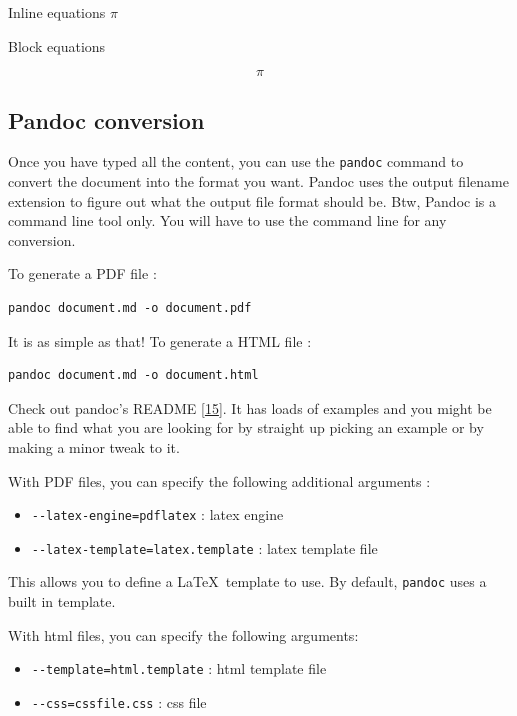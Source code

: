 \documentclass[journal,10pt,final]{IEEEtran}
\providecommand{\tightlist}{%
  \setlength{\itemsep}{0pt}\setlength{\parskip}{0pt}}
\begin{document}
Inline equations \(\pi\)

Block equations

\begin{equation}
\pi
\label{eq:pi}\end{equation}

\subsection{Pandoc conversion}\label{pandoc-conversion}

Once you have typed all the content, you can use the \texttt{pandoc}
command to convert the document into the format you want. Pandoc uses
the output filename extension to figure out what the output file format
should be. Btw, Pandoc is a command line tool only. You will have to use
the command line for any conversion.

To generate a PDF file :

\begin{verbatim}
pandoc document.md -o document.pdf
\end{verbatim}

It is as simple as that! To generate a HTML file :

\begin{verbatim}
pandoc document.md -o document.html
\end{verbatim}

Check out pandoc's README {[}\protect\hyperlink{ref-ux5fpandoc}{15}{]}.
It has loads of examples and you might be able to find what you are
looking for by straight up picking an example or by making a minor tweak
to it.

With PDF files, you can specify the following additional arguments :

\begin{itemize}
\tightlist
\item
  \texttt{-\/-latex-engine=pdflatex} : latex engine
\item
  \texttt{-\/-latex-template=latex.template} : latex template file
\end{itemize}

This allows you to define a \LaTeX~template to use. By default,
\texttt{pandoc} uses a built in template.

With html files, you can specify the following arguments:

\begin{itemize}
\tightlist
\item
  \texttt{-\/-template=html.template} : html template file
\item
  \texttt{-\/-css=cssfile.css} : css file
\end{itemize}
\end{document}
